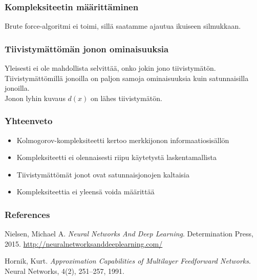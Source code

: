 \documentclass{beamer}
\begin{document}
   \begin{frame}
    \frametitle{Kompleksiteetin m{\"a}{\"a}ritt{\"a}minen}
    
    \Large Brute force-algoritmi ei toimi, sill{\"a} saatamme ajautua ikuiseen silmukkaan. 
    
	\vspace{3mm}    
    
    
    \vspace{3mm}
   \end{frame}
   
   \begin{frame}
    \frametitle{Tiivistym{\"a}tt{\"o}m{\"a}n jonon ominaisuuksia} 
    
    \Large Yleisesti ei ole mahdollista selvitt{\"a}{\"a}, onko jokin jono tiivistym{\"a}t{\"o}n. \\
	\vspace{3mm}   
	\Large Tiivistym{\"a}tt{\"o}mill{\"a} jonoilla on paljon samoja ominaisuuksia kuin satunnaisilla jonoilla. \\   
	\vspace{3mm}
	\Large Jonon lyhin kuvaus $d(x)$ on l{\"a}hes tiivistym{\"a}t{\"o}n.
    
   \end{frame}   
   
   \begin{frame}
    \frametitle{Yhteenveto}
    
   \begin{itemize}
	\Large \item Kolmogorov-kompleksiteetti kertoo merkkijonon informaatiosis{\"a}ll{\"o}n
	\item Kompleksiteetti ei olennaisesti riipu k{\"a}ytetyst{\"a} laskentamallista
	\item Tiivistym{\"a}tt{\"o}m{\"a}t jonot ovat satunnaisjonojen kaltaisia
	\item Kompleksiteettia ei yleens{\"a} voida m{\"a}{\"a}ritt{\"a}{\"a}
   \end{itemize}
   \end{frame}   
   
   \begin{frame}
   	\frametitle{References}
   	\begin{thebibliography}{Hornik, 1991}

   Nielsen, Michael A. {\em Neural Networks And Deep Learning}. Determination Press, 2015. \url{http://neuralnetworksanddeeplearning.com/}
  
   Hornik, Kurt. {\em Approximation Capabilities of Multilayer Feedforward Networks}. Neural Networks, 4(2), 251--257, 1991.
    
	\end{thebibliography}   
   \end{frame}  
\end{document}
